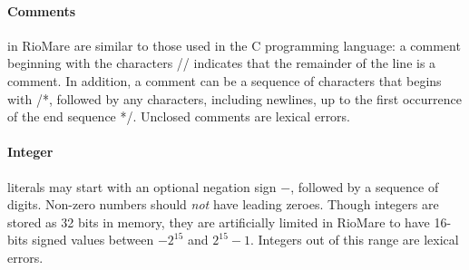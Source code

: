 \documentclass{article}
\begin{document}
\paragraph{Comments} in RioMare are similar to those used in the C programming language:
a comment beginning with the characters // indicates that the remainder of the line is a comment.
In addition, a comment can be a sequence of characters that begins with /*,
followed by any characters, including newlines, up to the first occurrence of the end sequence */. Unclosed comments are lexical errors.
\paragraph{Integer} literals may start with an optional negation sign $-$,
followed by a sequence of digits.
Non-zero numbers should \textit{not} have leading zeroes.
Though integers are stored as 32 bits in memory,
they are artificially limited in RioMare to have
16-bits signed values between $-2^{15}$ and $2^{15}-1$.
Integers out of this range are lexical errors.
\end{document}
